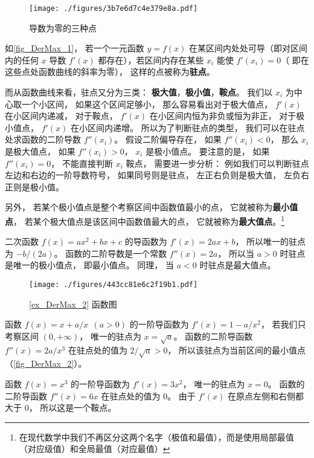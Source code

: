 
\begin{figure}[ht]
\vskip-10pt
\centering
\texttt{[image: ./figures/3b7e6d7c4e379e8a.pdf]}
\caption{导数为零的三种点}\label{fig_DerMax_1}
\end{figure}

如\autoref{fig_DerMax_1}， 若一个一元函数 $y = f(x)$ 在某区间内处处可导（即对区间内的任何 $x$ 导数 $f'(x)$ 都存在），若区间内存在某些 $x_i$ 能使 $f'(x_i) = 0$（ 即在这些点处函数曲线的斜率为零）， 这样的点被称为\textbf{驻点}。

而从函数曲线来看，驻点又分为三类： \textbf{极大值}，\textbf{极小值}，\textbf{鞍点}。 我们以 $x_i$ 为中心取一个小区间， 如果这个区间足够小， 那么容易看出对于极大值点， $f'(x)$ 在小区间内递减， 对于鞍点， $f'(x)$ 在小区间内恒为非负或恒为非正， 对于极小值点， $f'(x)$ 在小区间内递增。 所以为了判断驻点的类型， 我们可以在驻点处求函数的二阶导数 $f''(x_i)$。 假设二阶偏导存在， 如果 $f''(x_i) < 0$， 那么 $x_i$ 是极大值点， 如果 $f''(x_i) > 0$， $x_i$ 是极小值点。 要注意的是， 如果 $f''(x_i) = 0$， 不能直接判断 $x_i$  鞍点， 需要进一步分析： 例如我们可以判断驻点左边和右边的一阶导数符号， 如果同号则是驻点， 左正右负则是极大值， 左负右正则是极小值。

另外， 若某个极小值点是整个考察区间中函数值最小的点， 它就被称为\textbf{最小值点}， 若某个极大值点是该区间中函数值最大的点， 它就被称为\textbf{最大值点}。\footnote{在现代数学中我们不再区分这两个名字（极值和最值），而是使用局部最值（对应级值）和全局最值（对应最值）}

\begin{example}{}
二次函数 $f(x) = ax^2 + bx + c$ 的导函数为 $f'(x) = 2ax + b$， 所以唯一的驻点为 $-b/(2a)$。 函数的二阶导数是一个常数 $f''(x) = 2a$， 所以当 $a > 0$ 时驻点是唯一的极小值点， 即最小值点。 同理， 当 $a < 0$ 时驻点是最大值点。
\end{example}

\begin{figure}[ht]
\centering
\texttt{[image: ./figures/443cc81e6c2f19b1.pdf]}
\caption{\autoref{ex_DerMax_2} 函数图} \label{fig_DerMax_2}
\end{figure}

\begin{example}{}\label{ex_DerMax_2}
函数 $f(x) = x+a/x \ \ (a > 0)$ 的一阶导函数为 $f'(x) = 1 - a/x^2$， 若我们只考察区间 $(0, +\infty)$， 唯一的驻点为 $x = \sqrt{a}$。 函数的二阶导函数 $f''(x) = 2a/x^3$ 在驻点处的值为 $2/\sqrt{a} > 0$， 所以该驻点为当前区间的最小值点（\autoref{fig_DerMax_2}）。
\end{example}

\begin{example}{}\label{ex_DerMax_3}
函数 $f(x) = x^3$ 的一阶导函数为 $f'(x) = 3x^2$， 唯一的驻点为 $x = 0$。 函数的二阶导函数 $f''(x) = 6x$ 在驻点处的值为 $0$。 由于 $f'(x)$ 在原点左侧和右侧都大于 0， 所以这是一个鞍点。
\end{example}
